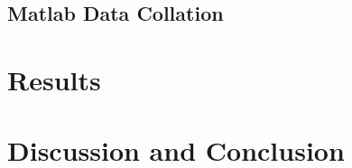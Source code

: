 \documentclass[runningheads]{llncs}
\begin{document}
\subsection{Matlab Data Collation}

\section{Results}


\section{Discussion and Conclusion}




%
%



\end{document}
